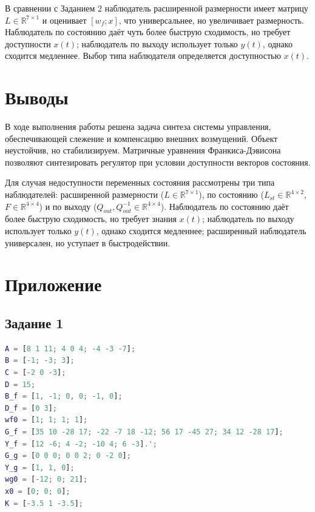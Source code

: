 \documentclass[a4paper,12pt]{article}
\begin{document}
В сравнении с Заданием 2 наблюдатель расширенной размерности имеет матрицу $L \in \mathbb{R}^{7 \times 1}$ и оценивает $[w_f; x]$, что универсальнее, но увеличивает размерность. Наблюдатель по состоянию даёт чуть более быструю сходимость, но требует доступности $x(t)$; наблюдатель по выходу использует только $y(t)$, однако сходится медленнее. Выбор типа наблюдателя определяется доступностью $x(t)$.


\newpage
\section{Выводы}

В ходе выполнения работы решена задача синтеза системы управления, обеспечивающей слежение и компенсацию внешних возмущений. Объект неустойчив, но стабилизируем. Матричные уравнения Франкиса-Дэвисона позволяют синтезировать регулятор при условии доступности векторов состояния.

Для случая недоступности переменных состояния рассмотрены три типа наблюдателей: расширенной размерности ($L \in \mathbb{R}^{7 \times 1}$), по состоянию ($L_{st} \in \mathbb{R}^{4 \times 2}$, $F \in \mathbb{R}^{4 \times 4}$) и по выходу ($Q_{out}, Q_{out}^{-1} \in \mathbb{R}^{4 \times 4}$). Наблюдатель по состоянию даёт более быструю сходимость, но требует знания $x(t)$; наблюдатель по выходу использует только $y(t)$, однако сходится медленнее; расширенный наблюдатель универсален, но уступает в быстродействии. 















	
	\newpage
	\section{Приложение}
	
\subsection*{Задание 1}

\begin{lstlisting}[caption={Инициализация}, language=matlab]
A = [8 1 11; 4 0 4; -4 -3 -7];
B = [-1; -3; 3];
C = [-2 0 -3];
D = 15;
B_f = [1, -1; 0, 0; -1, 0];
D_f = [0 3];
wf0 = [1; 1; 1; 1];
G_f = [35 10 -28 17; -22 -7 18 -12; 56 17 -45 27; 34 12 -28 17];
Y_f = [12 -6; 4 -2; -10 4; 6 -3].';
G_g = [0 0 0; 0 0 2; 0 -2 0];
Y_g = [1, 1, 0];
wg0 = [-12; 0; 21];
x0 = [0; 0; 0];
K = [-3.5 1 -3.5];
\end{lstlisting}
\end{document}
